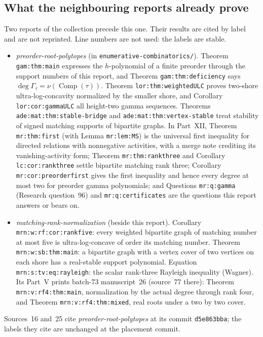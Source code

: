 \documentclass[11pt]{article}
\numberwithin{equation}{section}
\theoremstyle{definition}\newtheorem{definition}[theorem]{Definition}\newtheorem{remark}[theorem]{Remark}
\newcommand{\Ga}{\Gamma}                   %
\newcommand{\Comp}{\operatorname{Comp}}    %
\newcommand{\prp}{\emph{preorder-root-polytopes}}
\newcommand{\mrn}{\emph{matching-rank-normalization}}
\begin{document}
\subsection{What the neighbouring reports already prove}\label{pgr:sec:prior}
Two reports of the collection precede this one. Their results are cited by
label and are not reprinted. Line numbers are not used: the labels are
stable.
\begin{itemize}
\item \prp{} (in \texttt{enumerative-combinatorics/}). Theorem
  \texttt{gam:thm:main} expresses the $h$-polynomial of a finite preorder
  through the support numbers of this report, and Theorem
  \texttt{gam:thm:deficiency} says $\deg\Ga_\tau=\nu(\Comp(\tau))$.
  Theorem \texttt{lor:thm:weightedULC} proves two-shore ultra-log-concavity
  normalized by the smaller shore, and Corollary \texttt{lor:cor:gammaULC}
  all height-two gamma sequences. Theorems \texttt{ade:mat:thm:stable-bridge}
  and \texttt{ade:mat:thm:vertex-stable} treat stability of signed matching
  supports of bipartite graphs. In Part~XII, Theorem \texttt{mr:thm:first}
  (with Lemma \texttt{mr:lem:MS}) is the universal first inequality for
  directed relations with nonnegative activities, with a merge note
  crediting its vanishing-activity form; Theorem \texttt{mr:thm:rankthree}
  and Corollary \texttt{lc:cor:rankthree} settle bipartite matching rank
  three; Corollary \texttt{mr:cor:preorderfirst} gives the first inequality
  and hence every degree at most two for preorder gamma polynomials; and
  Questions \texttt{mr:q:gamma} (Research question~96) and
  \texttt{mr:q:certificates} are the questions this report answers or bears
  on.
\item \mrn{} (beside this report). Corollary \texttt{mrn:w:rf:cor:rankfive}:
  every weighted bipartite graph of matching number at most five is
  ultra-log-concave of order its matching number. Theorem
  \texttt{mrn:w:sb:thm:main}: a bipartite graph with a vertex cover of two
  vertices on each shore has a real-stable support polynomial. Equation
  \texttt{mrn:s:tv:eq:rayleigh}: the scalar rank-three Rayleigh inequality
  (Wagner). Its Part~V prints batch-73 manuscript~26 (source~77 there):
  Theorem \texttt{mrn:v:rf4:thm:main}, normalization by the actual degree
  through rank four, and Theorem \texttt{mrn:v:rf4:thm:mixed}, real roots
  under a two by two cover.
\end{itemize}
Sources~16 and~25 cite \prp{} at its commit \texttt{d5e863bba}; the labels
they cite are unchanged at the placement commit.
\end{document}
